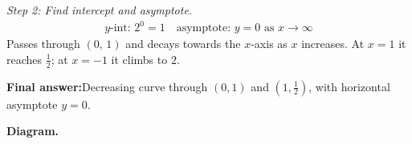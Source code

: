 \documentclass[11pt]{article}
\begin{document}
\textit{Step 2: Find intercept and asymptote.}
\[\begin{gathered}
y\text{-int: } 2^{0} = 1 \quad \text{asymptote: } y = 0 \text{ as } x \to \infty
\end{gathered}\]
Passes through \( (0,\,1) \) and decays towards the \( x \)-axis as \( x \) increases. At \( x = 1 \) it reaches \( \tfrac{1}{2} \); at \( x = -1 \) it climbs to \( 2 \).

\begin{answerbox}
\textbf{Final answer:}\quad Decreasing curve through \(\displaystyle (0, 1)\) and \(\displaystyle (1, \tfrac{1}{2})\), with horizontal asymptote \(\displaystyle  y = 0 \).
\end{answerbox}
\textbf{Diagram.}

\begin{center}
\end{center}
\end{document}
